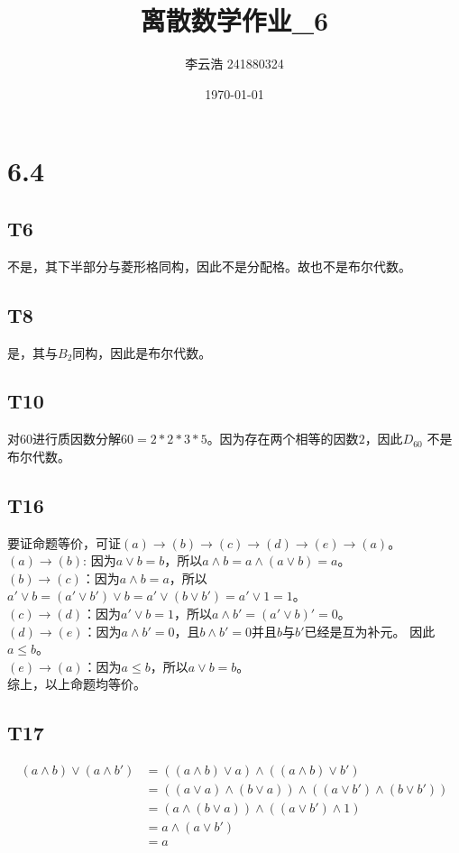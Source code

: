 \documentclass{article}
\title{离散数学作业\_6}
\author{李云浩 241880324}
\date{\today}
\begin{document}
\maketitle
\section{6.4}
\subsection{T6}
不是，其下半部分与菱形格同构，因此不是分配格。故也不是布尔代数。
\subsection{T8}
是，其与$B_2$同构，因此是布尔代数。
\subsection{T10}
对$60$进行质因数分解$60 = 2 * 2 * 3 * 5$。因为存在两个相等的因数$2$，因此$D_{60}$
不是布尔代数。
\subsection{T16}
要证命题等价，可证$(a) \rightarrow (b) \rightarrow (c) \rightarrow (d) \rightarrow (e) \rightarrow (a)$。\\
$(a) \rightarrow (b)$: 因为$a \lor b = b$，所以$a \land b = a \land (a \lor b) = a$。\\
$(b) \rightarrow (c)$：因为$a \land b = a$，所以$a' \lor b = (a' \lor b') \lor b = a' \lor (b \lor b') = a' \lor 1 = 1$。\\
$(c) \rightarrow (d)$：因为$a' \lor b = 1$，所以$a \land b' = (a' \lor b)' = 0$。\\
$(d) \rightarrow (e)$：因为$a \land b' = 0$，且$b \land b' = 0$并且$b$与$b'$已经是互为补元。
因此$a \leq b$。\\
$(e) \rightarrow (a)$：因为$a \leq b$，所以$a \lor b = b$。\\
综上，以上命题均等价。
\subsection{T17}
\begin{align*}
    (a \land b) \lor (a \land b') &= ((a \land b) \lor a) \land ((a \land b) \lor b')\\
    &= ((a \lor a) \land (b \lor a)) \land ((a \lor b') \land (b \lor b'))\\
    &= (a \land (b \lor a)) \land ((a \lor b') \land 1)\\
    &= a \land (a \lor b')\\
    &= a
\end{align*}
\end{document}
